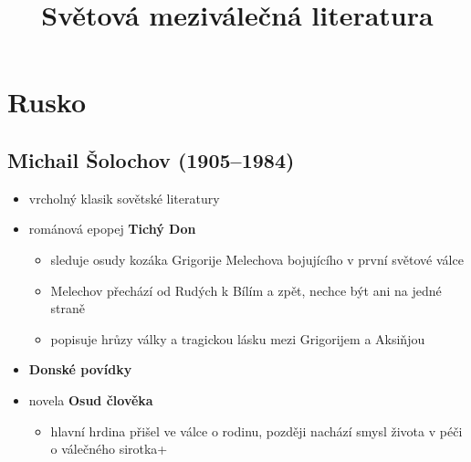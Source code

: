 \title{Světová meziválečná literatura}


\section{Rusko}
\subsection{Michail Šolochov (1905--1984)}
\begin{itemize}
\item vrcholný klasik sovětské literatury
\item románová epopej \textbf{Tichý Don}
	\begin{itemize}
	\item sleduje osudy kozáka Grigorije Melechova bojujícího v první světové válce
	\item Melechov přechází od Rudých k Bílím a zpět, nechce být ani na jedné straně
	\item popisuje hrůzy války a tragickou lásku mezi Grigorijem a Aksiňjou
	\end{itemize}
\item \textbf{Donské povídky}
\item novela \textbf{Osud člověka}
	\begin{itemize}
	\item hlavní hrdina přišel ve válce o rodinu, později nachází smysl života v péči o válečného sirotka+
	\end{itemize}
\end{itemize}

